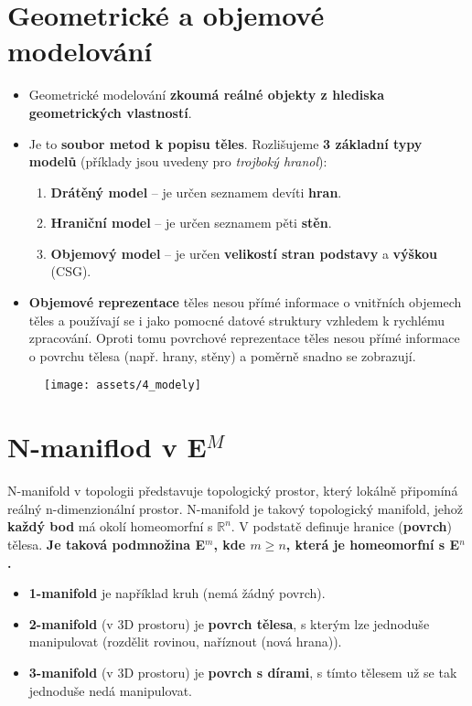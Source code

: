 
\section{Geometrické a objemové modelování}
\begin{itemize}
    \item Geometrické modelování \textbf{zkoumá reálné objekty z hlediska geometrických vlastností}.
    \item Je to \textbf{soubor metod k popisu těles}. Rozlišujeme \textbf{3 základní typy modelů} (příklady jsou uvedeny pro \textit{trojboký hranol}):
          \begin{enumerate}
              \item \textbf{Drátěný model} --  je určen seznamem devíti \textbf{hran}.
              \item \textbf{Hraniční model} -- je určen seznamem pěti \textbf{stěn}.
              \item \textbf{Objemový model} -- je určen \textbf{velikostí stran podstavy} a \textbf{výškou} (CSG).
          \end{enumerate}
    \item \textbf{Objemové reprezentace} těles nesou přímé informace o vnitřních objemech těles a používají se i jako pomocné datové struktury vzhledem k rychlému zpracování. Oproti tomu povrchové reprezentace těles nesou přímé informace o povrchu tělesa (např. hrany, stěny) a poměrně snadno se zobrazují.
\end{itemize}

\begin{figure}[H]
    \centering
    \texttt{[image: assets/4\_modely]}
\end{figure}

\section{N-maniflod v E$^M$}
N-manifold v topologii představuje topologický prostor, který lokálně připomíná reálný n-dimenzionální prostor. N-manifold je takový topologický manifold, jehož \textbf{každý bod} má okolí homeomorfní s $\mathbb{R}^n$. V podstatě definuje hranice (\textbf{povrch}) tělesa. \textbf{Je taková podmnožina E$^m$, kde $m \geq n$, která je homeomorfní s E$^n$.}
\begin{itemize}
    \item \textbf{1-manifold} je například kruh (nemá žádný povrch).
    \item \textbf{2-manifold} (v 3D prostoru) je \textbf{povrch tělesa}, s kterým lze jednoduše manipulovat (rozdělit rovinou, naříznout (nová hrana)).
    \item \textbf{3-manifold} (v 3D prostoru) je \textbf{povrch s dírami}, s tímto tělesem už se tak jednoduše nedá manipulovat.
\end{itemize}


